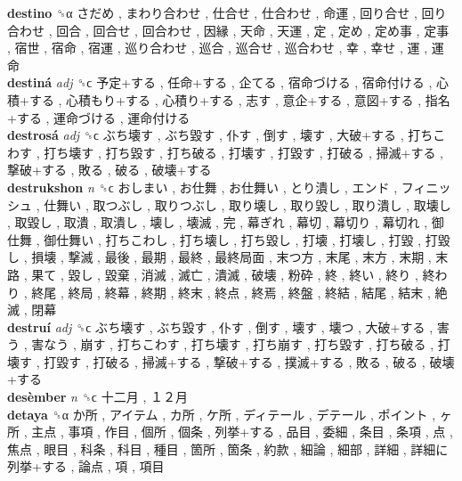 \textbf{destino} ␝α   さだめ ,  まわり合わせ ,  仕合せ ,  仕合わせ ,  命運 ,  回り合せ ,  回り合わせ ,  回合 ,  回合せ ,  回合わせ ,  因縁 ,  天命 ,  天運 ,  定 ,  定め ,  定め事 ,  定事 ,  宿世 ,  宿命 ,  宿運 ,  巡り合わせ ,  巡合 ,  巡合せ ,  巡合わせ ,  幸 ,  幸せ ,  運 ,  運命   \\
\textbf{destiná} \emph{adj}  ␝ϲ   予定+する ,  任命+する ,  企てる ,  宿命づける ,  宿命付ける ,  心積+する ,  心積もり+する ,  心積り+する ,  志す ,  意企+する ,  意図+する ,  指名+する ,  運命づける ,  運命付ける   \\
\textbf{destrosá} \emph{adj}  ␝ϲ   ぶち壊す ,  ぶち毀す ,  仆す ,  倒す ,  壊す ,  大破+する ,  打ちこわす ,  打ち壊す ,  打ち毀す ,  打ち破る ,  打壊す ,  打毀す ,  打破る ,  掃滅+する ,  撃破+する ,  敗る ,  破る ,  破壊+する   \\
\textbf{destrukshon} \emph{n}  ␝ϲ   おしまい ,  お仕舞 ,  お仕舞い ,  とり潰し ,  エンド ,  フィニッシュ ,  仕舞い ,  取つぶし ,  取りつぶし ,  取り壊し ,  取り毀し ,  取り潰し ,  取壊し ,  取毀し ,  取潰 ,  取潰し ,  壊し ,  壊滅 ,  完 ,  幕ぎれ ,  幕切 ,  幕切り ,  幕切れ ,  御仕舞 ,  御仕舞い ,  打ちこわし ,  打ち壊し ,  打ち毀し ,  打壊 ,  打壊し ,  打毀 ,  打毀し ,  損壊 ,  撃滅 ,  最後 ,  最期 ,  最終 ,  最終局面 ,  末つ方 ,  末尾 ,  末方 ,  末期 ,  末路 ,  果て ,  毀し ,  毀棄 ,  消滅 ,  滅亡 ,  潰滅 ,  破壊 ,  粉砕 ,  終 ,  終い ,  終り ,  終わり ,  終尾 ,  終局 ,  終幕 ,  終期 ,  終末 ,  終点 ,  終焉 ,  終盤 ,  終結 ,  結尾 ,  結末 ,  絶滅 ,  閉幕   \\
\textbf{destruí} \emph{adj}  ␝ϲ   ぶち壊す ,  ぶち毀す ,  仆す ,  倒す ,  壊す ,  壊つ ,  大破+する ,  害う ,  害なう ,  崩す ,  打ちこわす ,  打ち壊す ,  打ち崩す ,  打ち毀す ,  打ち破る ,  打壊す ,  打毀す ,  打破る ,  掃滅+する ,  撃破+する ,  撲滅+する ,  敗る ,  破る ,  破壊+する   \\
\textbf{desèmber} \emph{n}  ␝ϲ   十二月 ,  １２月   \\
\textbf{detaya} ␝α   か所 ,  アイテム ,  カ所 ,  ケ所 ,  ディテール ,  デテール ,  ポイント ,  ヶ所 ,  主点 ,  事項 ,  作目 ,  個所 ,  個条 ,  列挙+する ,  品目 ,  委細 ,  条目 ,  条項 ,  点 ,  焦点 ,  眼目 ,  科条 ,  科目 ,  種目 ,  箇所 ,  箇条 ,  約款 ,  細論 ,  細部 ,  詳細 ,  詳細に列挙+する ,  論点 ,  項 ,  項目   \\
